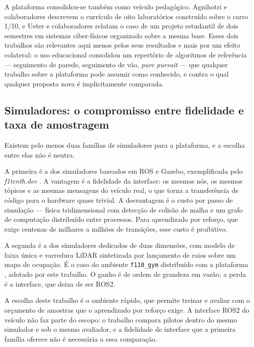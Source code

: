 A plataforma consolidou-se também como veículo pedagógico. Agnihotri e
colaboradores \cite{Agnihotri2020Teaching} descrevem o currículo de oito
laboratórios construído sobre o carro 1/10, e Ueter e colaboradores
\cite{Ueter2020CPS} relatam o caso de um projeto estudantil de dois semestres em
sistemas ciber-físicos organizado sobre a mesma base. Esses dois trabalhos são
relevantes aqui menos pelos seus resultados e mais por um efeito colateral: o uso
educacional consolidou um repertório de algoritmos de referência --- seguimento
de parede, seguimento de vão, \textit{pure pursuit} --- que qualquer trabalho
sobre a plataforma pode assumir como conhecido, e contra o qual qualquer
proposta nova é implicitamente comparada.

\subsection{Simuladores: o compromisso entre fidelidade e taxa de amostragem}

Existem pelo menos duas famílias de simuladores para a plataforma, e a escolha
entre elas não é neutra.

A primeira é a dos simuladores baseados em ROS e Gazebo, exemplificada pelo
\textit{f1tenth.dev} \cite{Babu2020Simulator}. A vantagem é a fidelidade da
interface: os mesmos nós, os mesmos tópicos e as mesmas mensagens do veículo
real, o que torna a transferência de código para o hardware quase trivial. A
desvantagem é o custo por passo de simulação --- física tridimensional com
detecção de colisão de malha e um grafo de computação distribuído entre
processos. Para aprendizado por reforço, que exige centenas de milhares a
milhões de transições, esse custo é proibitivo.

A segunda é a dos simuladores dedicados de duas dimensões, com modelo de faixa
única e varredura LiDAR sintetizada por lançamento de raios sobre um mapa de
ocupação. É o caso do ambiente \texttt{f110\_gym} distribuído com a plataforma
\cite{OKelly2020F1TENTH}, adotado por este trabalho. O ganho é de ordem de
grandeza em vazão; a perda é a interface, que deixa de ser ROS2.

A escolha deste trabalho é o ambiente rápido, que permite treinar e avaliar
com o orçamento de amostras que o aprendizado por reforço exige. A interface
ROS2 do veículo não faz parte do escopo: o trabalho compara pilotos dentro do
mesmo simulador e sob o mesmo avaliador, e a fidelidade de interface que a
primeira família oferece não é necessária a essa comparação.

